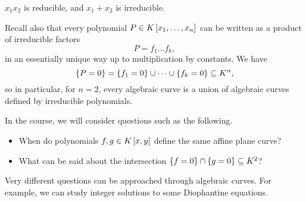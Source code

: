 \begin{example*}
$ x_1x_2 $ is reducible, and $ x_1 + x_2 $ is irreducible.
\end{example*}

\begin{remark}
Recall also that every polynomial $ P \in K\sbr{x_1, \dots, x_n} $ can be written as a product of irreducible factors
$$ P = f_1 \dots f_k, $$
in an essentially unique way up to multiplication by constants. We have
$$ \cbr{P = 0} = \cbr{f_1 = 0} \cup \dots \cup \cbr{f_k = 0} \subseteq K^n, $$
so in particular, for $ n = 2 $, every algebraic curve is a union of algebraic curves defined by irreducible polynomials.
\end{remark}

In the course, we will consider questions such as the following.
\begin{itemize}
\item When do polynomials $ f, g \in K\sbr{x, y} $ define the same affine plane curve?
\item What can be said about the intersection $ \cbr{f = 0} \cap \cbr{g = 0} \subseteq K^2 $?
\end{itemize}
Very different questions can be approached through algebraic curves. For example, we can study integer solutions to some Diophantine equations.

